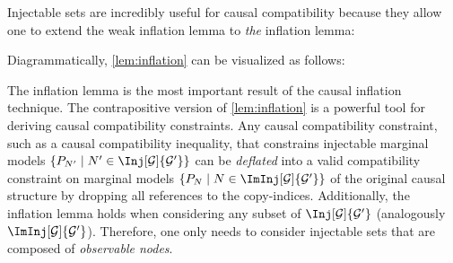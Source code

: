 \documentclass[aps, 10pt, english, twoside, pra, nofootinbib, tightenlines, longbibliography]{revtex4-1}
\begin{document}
    Injectable sets are incredibly useful for causal compatibility because they allow one to extend the weak inflation lemma to \textit{the} inflation lemma:
    Diagrammatically, \cref{lem:inflation} can be visualized as follows:

    \begin{center}
    \end{center}

    The inflation lemma is the most important result of the causal inflation technique. The contrapositive version of \cref{lem:inflation} is a powerful tool for deriving causal compatibility constraints. Any causal compatibility constraint, such as a causal compatibility inequality, that constrains injectable marginal models $\bc{\prob[N'] \mid N' \in \Inj[\graph]{\graph'}}$ can be \textit{deflated} into a valid compatibility constraint on marginal models $\bc{\prob[N] \mid N \in \ImInj[\graph]{\graph'}}$ of the original causal structure by dropping all references to the copy-indices. Additionally, the inflation lemma holds when considering any subset of $\Inj[\graph]{\graph'}$ (analogously $\ImInj[\graph]{\graph'}$). Therefore, one only needs to consider injectable sets that are composed of \textit{observable nodes}.
\end{document}
